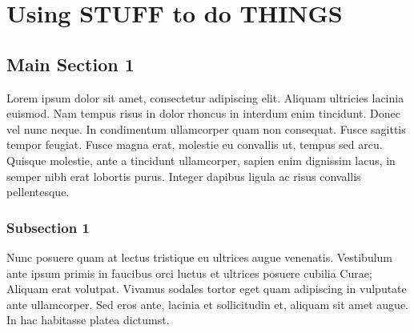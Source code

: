 
\chapter{Using STUFF to do THINGS} %

\label{Chapter5} %

\section{Main Section 1}

Lorem ipsum dolor sit amet, consectetur adipiscing elit. Aliquam ultricies lacinia euismod. Nam tempus risus in dolor rhoncus in interdum enim tincidunt. Donec vel nunc neque. In condimentum ullamcorper quam non consequat. Fusce sagittis tempor feugiat. Fusce magna erat, molestie eu convallis ut, tempus sed arcu. Quisque molestie, ante a tincidunt ullamcorper, sapien enim dignissim lacus, in semper nibh erat lobortis purus. Integer dapibus ligula ac risus convallis pellentesque.

\subsection{Subsection 1}

Nunc posuere quam at lectus tristique eu ultrices augue venenatis. Vestibulum ante ipsum primis in faucibus orci luctus et ultrices posuere cubilia Curae; Aliquam erat volutpat. Vivamus sodales tortor eget quam adipiscing in vulputate ante ullamcorper. Sed eros ante, lacinia et sollicitudin et, aliquam sit amet augue. In hac habitasse platea dictumst.




